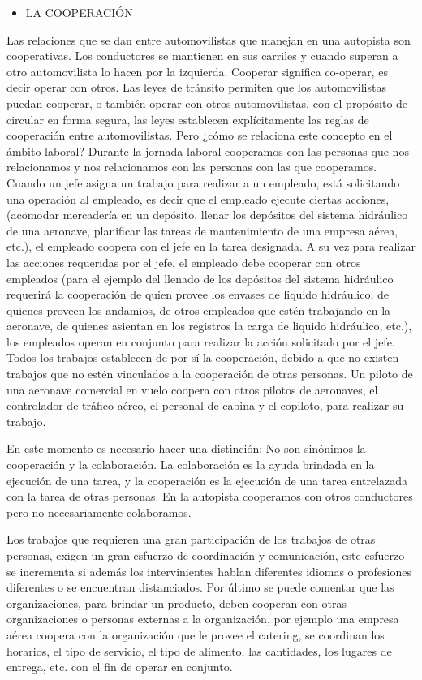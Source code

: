 \begin{itemize}
  \item LA COOPERACIÓN
\end{itemize}
Las relaciones que se dan entre automovilistas que manejan en una autopista son cooperativas. Los conductores se mantienen en sus carriles y cuando superan a otro automovilista lo hacen por la izquierda. Cooperar significa co-operar, es decir operar con otros. Las leyes de tránsito permiten que los automovilistas puedan cooperar, o también operar con otros automovilistas, con el propósito de circular en forma segura, las leyes establecen explícitamente las reglas de cooperación entre automovilistas. Pero ¿cómo se relaciona este concepto en el ámbito laboral? Durante la jornada laboral cooperamos con las personas que nos relacionamos y nos relacionamos con las personas con las que cooperamos. Cuando un jefe asigna un trabajo para realizar a un empleado, está solicitando una operación al empleado, es decir que el empleado ejecute ciertas acciones, (acomodar mercadería en un depósito, llenar los depósitos del sistema hidráulico de una aeronave, planificar las tareas de mantenimiento de una empresa aérea, etc.), el empleado coopera con el jefe en la tarea designada. A su vez para realizar las acciones requeridas por el jefe, el empleado debe cooperar con otros empleados (para el ejemplo del llenado de los depósitos del sistema hidráulico requerirá la cooperación de quien provee los envases de liquido hidráulico, de quienes proveen los andamios, de otros empleados que estén trabajando en la aeronave, de quienes asientan en los registros la carga de liquido hidráulico, etc.), los empleados operan en conjunto para realizar la acción solicitado por el jefe. Todos los trabajos establecen de por sí la cooperación, debido a que no existen trabajos que no estén vinculados a la cooperación de otras personas. Un piloto de una aeronave comercial en vuelo coopera con otros pilotos de aeronaves, el controlador de tráfico aéreo, el personal de cabina y el copiloto, para realizar su trabajo.

En este momento es necesario hacer una distinción: No son sinónimos la cooperación y la colaboración. La colaboración es la ayuda brindada en la ejecución de una tarea, y la cooperación es la ejecución de una tarea entrelazada con la tarea de otras personas. En la autopista cooperamos con otros conductores pero no necesariamente colaboramos.



Los trabajos que requieren una gran participación de los trabajos de otras personas, exigen un gran esfuerzo de coordinación y comunicación, este esfuerzo se incrementa si además los intervinientes hablan diferentes idiomas o profesiones diferentes o se encuentran distanciados. Por último se puede comentar que las organizaciones, para brindar un producto, deben cooperan con otras organizaciones o personas externas a la organización, por ejemplo una empresa aérea coopera con la organización que le provee el catering, se coordinan los horarios, el tipo de servicio, el tipo de alimento, las cantidades, los lugares de entrega, etc. con el fin de operar en conjunto.

